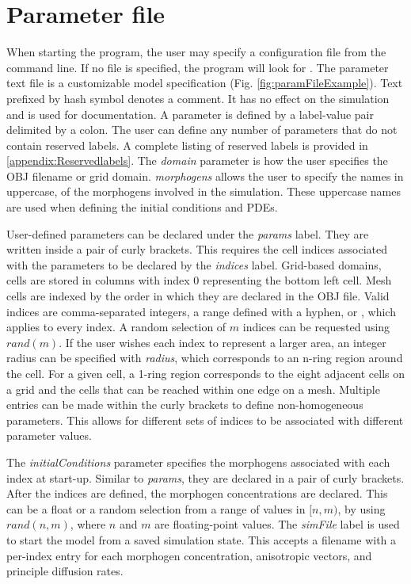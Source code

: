 \section{Parameter file}
When starting the program, the user may specify a configuration file from the command line. If no file is specified, the program will look for . The parameter text file is a customizable model specification (Fig. \ref{fig:paramFileExample}). Text prefixed by hash symbol denotes a comment. It has no effect on the simulation and is used for documentation. A parameter is defined by a label-value pair delimited by a colon. The user can define any number of parameters that do not contain reserved labels. A complete listing of reserved labels is provided in \ref{appendix:Reservedlabels}. The \textit{domain} parameter is how the user specifies the OBJ filename or grid domain. \textit{morphogens} allows the user to specify the names in uppercase, of the morphogens involved in the simulation. These uppercase names are used when defining the initial conditions and PDEs.

User-defined parameters can be declared under the \textit{params} label. They are written inside a pair of curly brackets. This requires the cell indices associated with the parameters to be declared by the \textit{indices} label. Grid-based domains, cells are stored in columns with index 0 representing the bottom left cell. Mesh cells are indexed by the order in which they are declared in the OBJ file. Valid indices are comma-separated integers, a range defined with a hyphen, or , which applies to every index. A random selection of $m$ indices can be requested using $rand(m)$. If the user wishes each index to represent a larger area, an integer radius can be specified with \textit{radius}, which corresponds to an n-ring region around the cell. For a given cell, a 1-ring region corresponds to the eight adjacent cells on a grid and the cells that can be reached within one edge on a mesh. Multiple entries can be made within the curly brackets to define non-homogeneous parameters. This allows for different sets of indices to be associated with different parameter values.

The \textit{initialConditions} parameter specifies the morphogens associated with each index at start-up. Similar to \textit{params}, they are declared in a pair of curly brackets. After the indices are defined, the morphogen concentrations are declared. This can be a float or a random selection from a range of values in $[n, m)$, by using $rand(n, m)$, where $n$ and $m$ are floating-point values. The \textit{simFile} label is used to start the model from a saved simulation state. This accepts a filename with a per-index entry for each morphogen concentration, anisotropic vectors, and principle diffusion rates.

